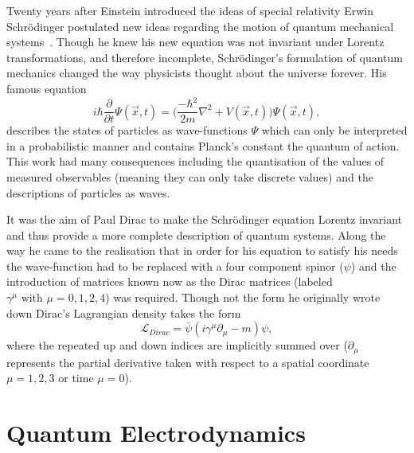 Twenty years after Einstein introduced the ideas of special relativity Erwin
Schr\"odinger postulated new ideas regarding the motion of quantum mechanical
systems~\cite{Schrodinger}. Though he knew his new equation was not invariant
under Lorentz transformations, and therefore incomplete, Schr\"odinger's
formulation of quantum mechanics changed the way physicists thought about the
universe forever. His famous equation
\begin{equation}
  \label{eq:schrodinger} i\hbar\frac{\partial}{\partial t}\Psi(\vec{x}, t) =
\Bigg(\frac{-\hbar^{2}}{2m}\nabla^{2} + V(\vec{x}, t) \Bigg)\Psi(\vec{x}, t),
\end{equation} describes the states of particles as wave-functions $\Psi$ which
can only be interpreted in a probabilistic manner and contains Planck's constant
the quantum of action. This work had many consequences including the
quantisation of the values of measured observables (meaning they can only take
discrete values) and the descriptions of particles as waves.

It was the aim of Paul Dirac to make the Schr\"odinger equation Lorentz
invariant and thus provide a more complete description of quantum systems. Along
the way he came to the realisation that in order for his equation to satisfy his
needs the wave-function had to be replaced with a four component spinor ($\psi$)
and the introduction of matrices known now as the Dirac matrices (labeled
$\gamma^{\mu} \text{ with } \mu=0,1,2,4$) was required. Though not the form he
originally wrote down Dirac's Lagrangian density takes the form
  \begin{equation}
    \label{eq:dirac} \mathcal{L}_{Dirac} =
\bar{\psi}(i\gamma^{\mu}\partial_{\mu} - m)\psi,
  \end{equation} where the repeated up and down indices are implicitly summed
over ($\partial_{\mu}$ represents the partial derivative taken with respect to a
spatial coordinate $\mu = 1,2,3$ or time $\mu = 0$).

\section{Quantum Electrodynamics}

